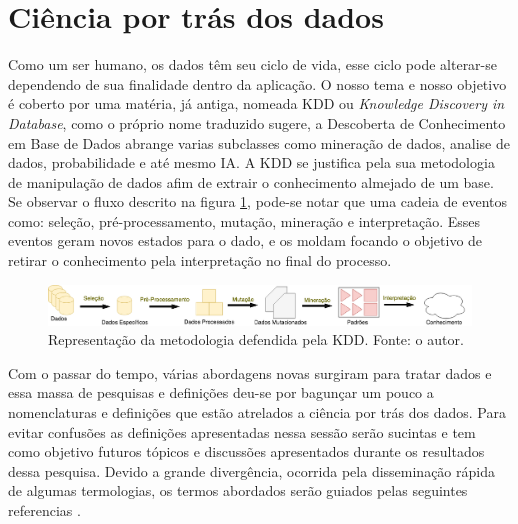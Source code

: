 \section{Ciência por trás dos dados}
Como um ser humano, os dados têm seu ciclo de vida, esse ciclo pode alterar-se dependendo de sua finalidade dentro da aplicação. O nosso tema e nosso objetivo é coberto por uma matéria, já antiga, nomeada KDD ou \textit{Knowledge Discovery in Database}, como o próprio nome traduzido sugere, a Descoberta de Conhecimento em Base de Dados abrange varias subclasses como mineração de dados, analise de dados, probabilidade e até mesmo IA. A KDD se justifica pela sua metodologia de manipulação de dados afim de extrair o conhecimento almejado de um base. Se observar o fluxo descrito na figura \ref{fig:kdd}, pode-se notar que uma cadeia de eventos como: seleção, pré-processamento, mutação, mineração e interpretação. Esses eventos geram novos estados para o dado, e os moldam focando o objetivo de retirar o conhecimento pela interpretação no final do processo.

\begin{figure}[H]
    \centering
    \includegraphics[width=.8\textwidth]{imagens/kdd.png}
    \caption{Representação da metodologia defendida pela KDD. Fonte: o autor.}
    \label{fig:kdd}
\end{figure}

Com o passar do tempo, várias abordagens novas surgiram para tratar dados e essa massa de pesquisas e definições deu-se por bagunçar um pouco a nomenclaturas e definições que estão atrelados a ciência por trás dos dados. Para evitar confusões as definições apresentadas nessa sessão serão sucintas e tem como objetivo futuros tópicos e discussões apresentados durante os resultados dessa pesquisa. Devido a grande divergência, ocorrida pela disseminação rápida de algumas termologias, os termos abordados serão guiados pelas seguintes referencias \cite{laender2002brief, fayyad1996kdd, hand2007principles}.





 

